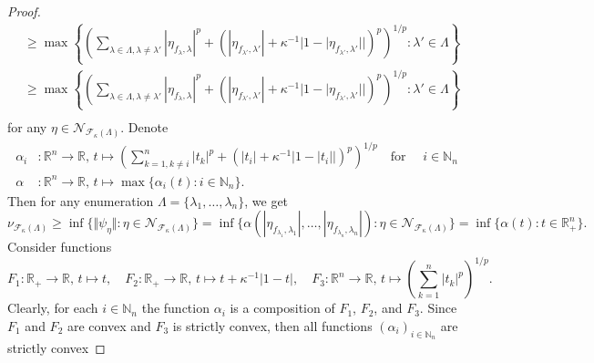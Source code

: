 \documentclass[12pt]{article}
\begin{document}
\begin{proof}
\[\begin{aligned}
        &\geq\max\left\{
            \left(
                \sum_{\lambda\in\Lambda,\lambda\neq \lambda'}
                    |\eta_{f_\lambda,\lambda}|^p+
                    (
                        |\eta_{f_{\lambda'},\lambda'}|+
                        \kappa^{-1}|1-|\eta_{f_{\lambda'},\lambda'}||
                    )^p
            \right)^{1/p}:
            \lambda'\in\Lambda
        \right\} \\
        &\geq\max\left\{
            \left(
                \sum_{\lambda\in\Lambda,\lambda\neq \lambda'} 
                    |\eta_{f_\lambda,\lambda}|^p+
                    (
                        |\eta_{f_{\lambda'},\lambda'}|+
                        \kappa^{-1}|1-|\eta_{f_{\lambda'},\lambda'}||
                    )^p
            \right)^{1/p}:
            \lambda'\in\Lambda
        \right\} \\
    \end{aligned}
    \]
    for any $\eta\in\mathcal{N}_{\mathcal{F}_{\kappa}(\Lambda)}$. Denote
    \[
    \begin{aligned}
        \alpha_i&:\mathbb{R}^n\to\mathbb{R},\,
        t\mapsto \left(
            \sum_{k=1,k\neq i}^n |t_k|^p+(|t_i|+\kappa^{-1}|1-|t_i||)^p
        \right)^{1/p} \quad\text{for }\quad i\in\mathbb{N}_n \\
        \alpha&:\mathbb{R}^n\to\mathbb{R},\,
        t\mapsto\max\{\alpha_i(t):i\in\mathbb{N}_n\}.
    \end{aligned}
    \]
    Then for any enumeration $\Lambda=\{\lambda_1,\ldots,\lambda_n\}$, we get
    \[
        \nu_{\mathcal{F}_{\kappa}(\Lambda)}
        \geq\inf\{
            \Vert \psi_{\eta}\Vert : 
            \eta\in\mathcal{N}_{\mathcal{F}_{\kappa}(\Lambda)}
        \}
        =\inf\{
            \alpha(
                |\eta_{f_{\lambda_1},\lambda_1}|,
                \ldots,
                |\eta_{f_{\lambda_n},\lambda_n}|
            ) : 
            \eta\in\mathcal{N}_{\mathcal{F}_{\kappa}(\Lambda)}
        \}
        =\inf\{\alpha(t) : t\in\mathbb{R}_+^n\}.
    \]
    Consider functions
    \[
        F_1:\mathbb{R}_+\to\mathbb{R},\, 
            t\mapsto t, \quad
        F_2:\mathbb{R}_+\to\mathbb{R},\, 
            t\mapsto t+\kappa^{-1}|1-t|, \quad
        F_3:\mathbb{R}^n\to\mathbb{R},\, t\mapsto 
            \left(\sum_{k=1}^n|t_k|^p\right)^{1/p}.
    \]
    Clearly, for each $i\in\mathbb{N}_n$ the function $\alpha_i$ is a 
    composition of $F_1$, $F_2$, and $F_3$. Since $F_1$ and $F_2$ are convex 
    and $F_3$ is strictly convex, then all 
    functions $(\alpha_i)_{i\in\mathbb{N}_n}$ are strictly convex 

\end{proof}
\end{document}

